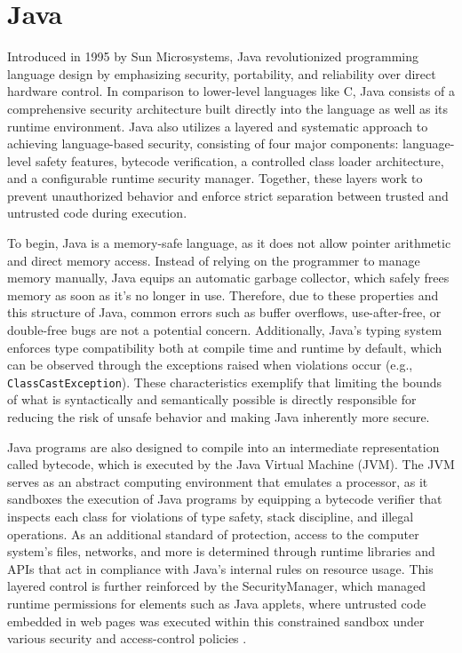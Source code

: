 \documentclass[conference]{IEEEtran}
\begin{document}
\section{Java}

Introduced in 1995 by Sun Microsystems, Java revolutionized programming language design by emphasizing security, portability, and reliability over direct hardware control. In comparison to lower-level languages like C, Java consists of a comprehensive security architecture built directly into the language as well as its runtime environment. Java also utilizes a layered and systematic approach to achieving language-based security, consisting of four major components: language-level safety features, bytecode verification, a controlled class loader architecture, and a configurable runtime security manager. Together, these layers work to prevent unauthorized behavior and enforce strict separation between trusted and untrusted code during execution.

To begin, Java is a memory-safe language, as it does not allow pointer arithmetic and direct memory access. Instead of relying on the programmer to manage memory manually, Java equips an automatic garbage collector, which safely frees memory as soon as it's no longer in use. Therefore, due to these properties and this structure of Java, common errors such as buffer overflows, use-after-free, or double-free bugs are not a potential concern. Additionally, Java’s typing system enforces type compatibility both at compile time and runtime by default, which can be observed through the exceptions raised when violations occur (e.g., \texttt{ClassCastException}). These characteristics exemplify that limiting the bounds of what is syntactically and semantically possible is directly responsible for reducing the risk of unsafe behavior and making Java inherently more secure.

Java programs are also designed to compile into an intermediate representation called bytecode, which is executed by the Java Virtual Machine (JVM). The JVM serves as an abstract computing environment that emulates a processor, as it sandboxes the execution of Java programs by equipping a bytecode verifier that inspects each class for violations of type safety, stack discipline, and illegal operations. As an additional standard of protection, access to the computer system's files, networks, and more is determined through runtime libraries and APIs that act in compliance with Java’s internal rules on resource usage. This layered control is further reinforced by the SecurityManager, which managed runtime permissions for elements such as Java applets, where untrusted code embedded in web pages was executed within this constrained sandbox under various security and access-control policies \cite{Sterbenz2000}.
\end{document}
